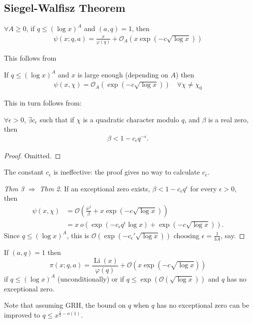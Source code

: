 \documentclass{article}
\newcommand{\1}{\mathbbm{1}}
\newcommand{\bigO}{\mathcal{O}}
\DeclareMathOperator\Li{Li}
\begin{document}
\subsection{Siegel-Walfisz Theorem}
\begin{thm}
  $\forall A \geq 0$, if $q \leq (\log x)^A$ and $(a,q) = 1$, then
  \begin{align*}
    \psi(x;q,a) = \frac{x}{\varphi(q)} + \bigO_A(x \exp(-c \sqrt{\log x}))
  \end{align*}
\end{thm}
This follows from
\begin{thm}
  If $q \leq (\log x)^A$ and $x$ is large enough (depending on $A$) then
  \begin{align*}
    \psi(x,\chi) = \bigO_A(\exp(-c \sqrt{\log x})) \quad \forall \chi \neq \chi_0
  \end{align*}
\end{thm}
This in turn follows from:
\begin{thm}[Siegel]
  $\forall \epsilon > 0$, $\exists c_\epsilon$ such that if $\chi$ is a quadratic character modulo $q$, and $\beta$ is a real zero, then
  \begin{align*}
    \beta < 1 - c_\epsilon q^{-\epsilon}.
  \end{align*}
\end{thm}
\begin{proof}
  Omitted.
\end{proof}
The constant $c_\epsilon$ is ineffective: the proof gives no way to calculate $c_\epsilon$.
\begin{proof}[Thm 3 $\Rightarrow$ Thm 2]
  If an exceptional zero exists, $\beta < 1 - c_\epsilon q^\epsilon$ for every $\epsilon > 0$, then
  \begin{align*}
    \psi(x,\chi) &= \bigO\left(\frac{x^\beta}{\beta} + x \exp(-c \sqrt{\log x})\right) \\
                 &= x\ o\!\left(\exp(-c_\epsilon q^\epsilon \log x) + \exp(-c \sqrt{\log x})\right).
  \end{align*}
  Since $q \leq (\log x)^A$, this is $\bigO(\exp(-c_\epsilon' \sqrt{\log x}))$ choosing $\epsilon = \frac{1}{3A}$, say.
\end{proof}

\begin{cor}
\newlec
  If $(a, q) = 1$ then
  \begin{equation*}
    \pi(x; q, a) = \frac{\Li(x)}{\varphi(q)} + \bigO\left(x \exp (-c \sqrt{\log x})\right)
  \end{equation*}
  if \(q \leq (\log x)^A\) (unconditionally) or if \(q \leq \exp\left(\bigO(\sqrt{\log x})\right)\) and \(q\) has no exceptional zero.
\end{cor}
Note that assuming GRH, the bound on \(q\) when \(q\) has no exceptional zero can be improved to \(q \leq x^{\frac{1}{2} - o(1)}\).
\end{document}
